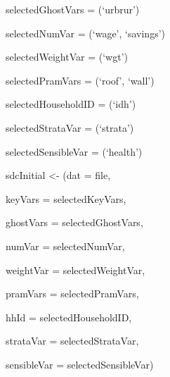 \documentclass[letterpaper,10pt,english]{sphinxmanual}
\begin{document}
\begin{DUlineblock}{0em}
\item[] 
\item[] selectedGhostVars = (‘urbrur’)
\item[] 
\item[] selectedNumVar = (‘wage’, ‘savings’)
\item[] 
\item[] selectedWeightVar = (‘wgt’)
\item[] 
\item[] selectedPramVars = (‘roof’, ‘wall’)
\item[] 
\item[] selectedHouseholdID = (‘idh’)
\item[] 
\item[] selectedStrataVar = (‘strata’)
\end{DUlineblock}

\begin{DUlineblock}{0em}
\item[] 
\item[] selectedSensibleVar = (‘health’)
\end{DUlineblock}

\begin{DUlineblock}{0em}
\item[] 
\item[] sdcInitial \textless{}- (dat = file,
\item[] keyVars = selectedKeyVars,
\item[] ghostVars = selectedGhostVars,
\item[] numVar = selectedNumVar,
\item[] weightVar = selectedWeightVar,
\item[] pramVars = selectedPramVars,
\item[] hhId = selectedHouseholdID,
\item[] strataVar = selectedStrataVar,
\item[] sensibleVar = selectedSensibleVar)
\end{DUlineblock}
\end{document}
